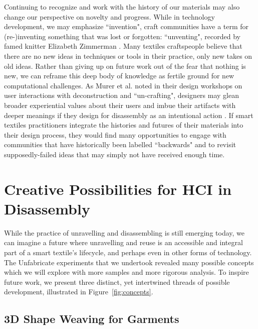 \documentclass{sigchi}
\begin{document}
Continuing to recognize and work with the history of our materials may also change our perspective on novelty and progress. While in technology development, we may emphasize ``invention", craft communities have a term for (re-)inventing something that was lost or forgotten: ``unventing", recorded by famed knitter Elizabeth Zimmerman \cite{zimmermann_almanac_2012}. Many textiles craftspeople believe that there are no new ideas in techniques or tools in their practice, only new takes on old ideas. Rather than giving up on future work out of the fear that nothing is new, we can reframe this deep body of knowledge as fertile ground for new computational challenges. As Murer et al. noted in their design workshops on user interactions with deconstruction and ``un-crafting", designers may glean broader experiential values about their users and imbue their artifacts with deeper meanings if they design for disassembly as an intentional action \cite{Murer:2018:MTA:3196709.3196806, Murer:2017:UDE:3024969.3024993, Murer:2015:DID:2882850.2882860}. If smart textiles practitioners integrate the histories and futures of their materials into their design process, they would find many opportunities to engage with communities that have historically been labelled ``backwards" and to revisit supposedly-failed ideas that may simply not have received enough time.


\section{Creative Possibilities for HCI in Disassembly} 
While the practice of unravelling and disassembling is still emerging today, we can imagine a future where unravelling and reuse is an accessible and integral part of a smart textile's lifecycle, and perhaps even in other forms of technology. The Unfabricate experiments that we undertook revealed many possible concepts which we will explore with more samples and more rigorous analysis. To inspire future work, we present three distinct, yet intertwined threads of possible development, illustrated in Figure~\ref{fig:concepts}.

\subsection{3D Shape Weaving for Garments}
\end{document}
